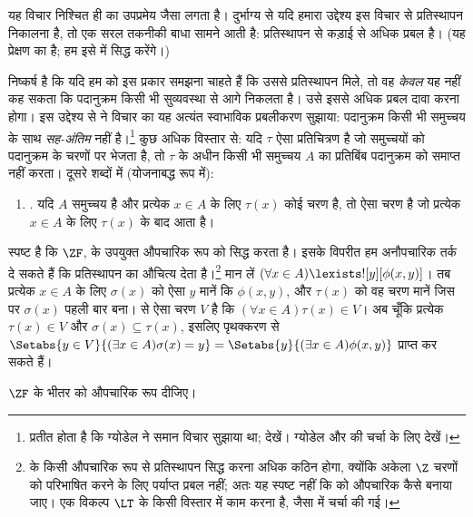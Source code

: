 \documentclass[../../../include/open-logic-section]{subfiles}
\begin{document}
यह विचार निश्चित ही \stagesinex{} का उपप्रमेय जैसा लगता है। दुर्भाग्य से
यदि हमारा उद्देश्य इस विचार से प्रतिस्थापन निकालना है, तो एक सरल तकनीकी बाधा
सामने आती है: प्रतिस्थापन
 से कड़ाई से अधिक प्रबल
है। (यह प्रेक्षण \citet[\S13.2]{Potter2004} का है; हम इसे
 में सिद्ध करेंगे।)

निष्कर्ष है कि यदि हम \stagesinex{} को इस प्रकार समझना चाहते हैं कि उससे
प्रतिस्थापन मिले, तो वह \emph{केवल} यह नहीं कह सकता कि पदानुक्रम किसी भी
सुव्यवस्था से आगे निकलता है। उसे इससे अधिक प्रबल दावा करना होगा। इस उद्देश्य
से \cite{Shoenfield:AST} ने विचार का यह अत्यंत स्वाभाविक प्रबलीकरण सुझाया:
पदानुक्रम किसी भी समुच्चय के साथ \emph{सह-अंतिम} नहीं है।\footnote{प्रतीत
होता है कि ग्योडेल ने समान विचार सुझाया था; \citet[p.~223]{Potter2004}
देखें। ग्योडेल और \citeauthor{Shoenfield:AST} की चर्चा के लिए
\citet[90--5]{Incurvati2020} देखें।} कुछ अधिक विस्तार से: यदि $\tau$ ऐसा
प्रतिचित्रण है जो समुच्चयों को पदानुक्रम के चरणों पर भेजता है, तो $\tau$ के
अधीन किसी भी समुच्चय $A$ का प्रतिबिंब पदानुक्रम को समाप्त नहीं करता। दूसरे
शब्दों में (योजनाबद्ध रूप में):
\begin{enumerate}
	\item[] \stagescofin. यदि $A$ समुच्चय है और प्रत्येक $x \in A$ के लिए
	$\tau(x)$ कोई चरण है, तो ऐसा चरण है जो प्रत्येक $x \in A$ के लिए
	$\tau(x)$ के बाद आता है।
\end{enumerate}
स्पष्ट है कि $\ZF$, \stagescofin{} के उपयुक्त औपचारिक रूप को सिद्ध करता
है। इसके विपरीत हम अनौपचारिक तर्क दे सकते हैं कि \stagescofin{} प्रतिस्थापन
का औचित्य देता है।\footnote{\stagescofin{} के किसी औपचारिक रूप से
प्रतिस्थापन सिद्ध करना अधिक कठिन होगा, क्योंकि अकेला $\Z$ चरणों को परिभाषित
करने के लिए पर्याप्त प्रबल नहीं; अतः यह स्पष्ट नहीं कि \stagescofin{} को
औपचारिक कैसे बनाया जाए। एक विकल्प $\LT$ के किसी विस्तार में काम करना है,
जैसा  में चर्चा की गई।} मान लें
$(\forall x \in A)\lexists![y][\phi(x,y)]$। तब प्रत्येक $x \in A$ के लिए
$\sigma(x)$ को ऐसा $y$ मानें कि $\phi(x,y)$, और $\tau(x)$ को वह चरण मानें
जिस पर $\sigma(x)$ पहली बार बना। \stagescofin{} से ऐसा चरण $V$ है कि
$(\forall x \in A)\tau(x)\in V$। अब चूँकि प्रत्येक $\tau(x) \in V$ और
$\sigma(x) \subseteq \tau(x)$, इसलिए पृथक्करण से
$\Setabs{y \in V}{(\exists x \in A)\sigma(x) = y}
= \Setabs{y}{(\exists x \in A)\phi(x,y)}$ प्राप्त कर सकते हैं।

\begin{prob}
	$\ZF$ के भीतर \stagescofin{} को औपचारिक रूप दीजिए।
\end{prob}
\end{document}
